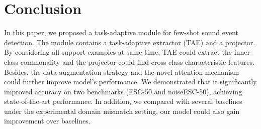 \documentclass[a4paper]{article}
\begin{document}
\section{Conclusion}
In this paper, we proposed a task-adaptive module for few-shot sound event detection. The module contains a task-adaptive extractor (TAE) and a projector. By considering all support examples at same time, TAE could extract the inner-class commonality and the projector could find cross-class characteristic features. Besides, the data augmentation strategy and the novel attention mechanism could further improve model’s performance. We demonstrated that it significantly improved accuracy on two benchmarks (ESC-50 and noiseESC-50), achieving state-of-the-art performance. In addition, we compared with several baselines under the experimental domain mismatch setting, our model could also gain improvement over baselines.



\end{document}
